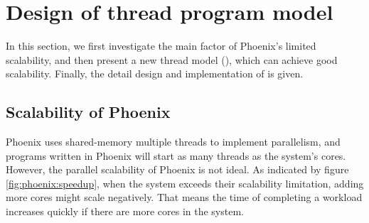 \section{Design of thread program model}
In this section, we first investigate the main factor of Phoenix's limited scalability, 
and then present a new thread model (\myth), which can achieve good scalability.
Finally, the detail design and implementation of \myth is given.


\subsection{Scalability of Phoenix}
Phoenix uses shared-memory multiple threads to implement parallelism,
and programs written in Phoenix will  start as many threads as the system’s cores.
However, the parallel scalability of Phoenix is not ideal.
As indicated by figure \ref{fig:phoenix:speedup}, 
when the system exceeds their scalability limitation, 
adding more cores might scale negatively.
That means the time of completing a workload increases quickly if there are more cores in the system. 

